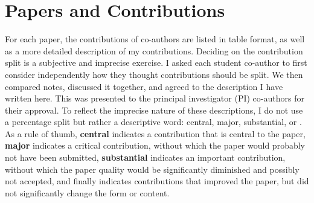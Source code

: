 \section{Papers and Contributions}
For each paper, the contributions of co-authors are listed in table format, as well as a more detailed description of my contributions. Deciding on the contribution split is a subjective and imprecise exercise. I asked each student co-author to first consider independently how they thought contributions should be split. We then compared notes, discussed it together, and agreed to the description I have written here. This was presented to the principal investigator (PI) co-authors for their approval. To reflect the imprecise nature of these descriptions, I do not use a percentage split but rather a descriptive word: central, major, substantial, or \negdot. As a rule of thumb, \textbf{central} indicates a contribution that is central to the paper, \textbf{major} indicates a critical contribution, without which the paper would probably not have been submitted, \textbf{substantial} indicates an important contribution, without which the paper quality would be significantly diminished and possibly not accepted, and finally \textbf{\negligible} indicates contributions that improved the paper, but did not significantly change the form or content.

